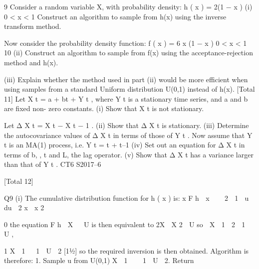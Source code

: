 \documentclass[a4paper,12pt]{article}
\begin{document}
\begin{enumerate}
9
Consider a random variable X, with probability density:
h ( x ) = 2(1 − x )
(i)
0 < x < 1
Construct an algorithm to sample from h(x) using the inverse transform
method.

Now consider the probability density function:
f ( x ) = 6 x (1 − x ) 0 < x < 1
10
(ii) Construct an algorithm to sample from f(x) using the acceptance-rejection
method and h(x).

(iii) Explain whether the method used in part (ii) would be more efficient when
using samples from a standard Uniform distribution U(0,1) instead of h(x). 
[Total 11]
Let X t = a + bt + Y t , where Y t is a stationary time series, and a and b are fixed non-
zero constants.
(i)
Show that X t is not stationary.

Let Δ X t = X t − X t − 1 .
(ii) Show that Δ X t is stationary. 
(iii) Determine the autocovariance values of Δ X t in terms of those of Y t . 
Now assume that Y t is an MA(1) process, i.e. Y t = \varepsilon t + \beta\varepsilon t–1
(iv) Set out an equation for Δ X t in terms of b, \beta , \varepsilon t and L, the lag operator.
(v) Show that Δ X t has a variance larger than that of Y t .
CT6 S2017–6


[Total 12]

Q9
(i)
The cumulative distribution function for h ( x ) is:
x
F h  x    2  1  u  du  2 x  x 2

0
the equation F h  X   U is then equivalent to 2X  X 2  U
so
 X  1  2  1  U ,

1
X  1   1  U  2
[11⁄2]
so the required inversion is then obtained. Algorithm is therefore:
1. Sample u from U(0,1)
X  1    1  U 
2. Return



\end{enumerate}
\end{document}
